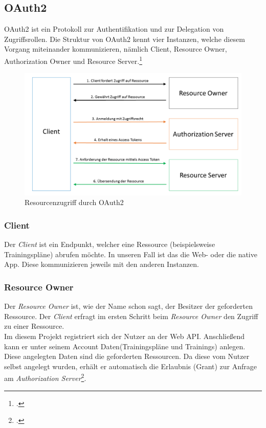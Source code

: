 \subsection{OAuth2}
\label{ssec:oauth2}
OAuth2 ist ein Protokoll zur Authentifikation und zur Delegation von Zugriffsrollen. Die Struktur von OAuth2 kennt vier Instanzen, welche diesem Vorgang miteinander kommunizieren, nämlich Client, Resource Owner, Authorization Owner und Resource Server.\footcite[S. 286]{book:AngularJs:Steyer2015} 
\begin{figure}[h]
\centering
\includegraphics[width=1\linewidth]{content/images/OAuth2}
\caption{Resourcenzugriff durch OAuth2}
\label{pic:OAuth2}
\end{figure}
\subsubsection*{Client}
Der \textit{Client} ist ein Endpunkt, welcher eine Ressource (beispielsweise Trainingspläne) abrufen möchte. In unseren Fall ist das die Web- oder die native App. Diese kommunizieren jeweils mit den anderen Instanzen.
\subsubsection*{Resource Owner}
Der \textit{Resource Owner} ist, wie der Name schon sagt, der Besitzer der geforderten Ressource. Der \textit{Client} erfragt im ersten Schritt beim \textit{Resource Owner} den Zugriff zu einer Ressource.\\
Im diesem Projekt registriert sich der Nutzer an der Web \ac{API}. Anschließend kann er unter seinem Account Daten(Trainingspläne und Trainings) anlegen. Diese angelegten Daten sind die geforderten Ressourcen. Da diese vom Nutzer selbst angelegt wurden, erhält er automatisch die Erlaubnis (\ac{Grant}) zur Anfrage am \textit{Authorization Server}\footcite{online:Implemented_OAuth_WebToken}.
